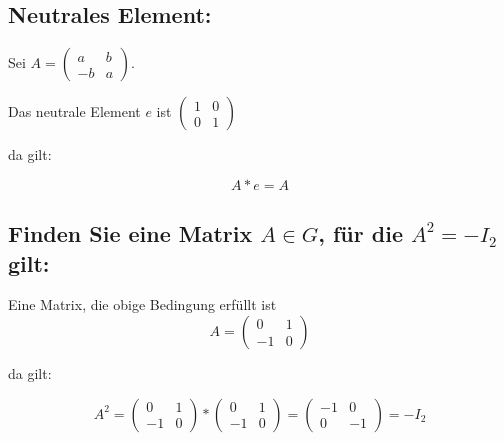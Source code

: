 \documentclass{article}
\begin{document}
\subsection*{Neutrales Element:}

Sei
\(
A=
\begin{pmatrix}
a & b \\
-b & a
\end{pmatrix}
\).

Das neutrale Element \(e\) ist
\(
\begin{pmatrix}
1 & 0 \\
0 & 1
\end{pmatrix}
\)

da gilt:

\[A * e = A\]

\subsection*{Finden Sie eine Matrix \(A \in G\), für die \(A^2=-I_{2}\) gilt:}

Eine Matrix, die obige Bedingung erfüllt ist
\[
A =
\begin{pmatrix}
0 & 1 \\
-1 & 0
\end{pmatrix}
\]

da gilt:

\[
A^2
=
\begin{pmatrix}
0 & 1 \\
-1 & 0
\end{pmatrix}
*
\begin{pmatrix}
0 & 1 \\
-1 & 0
\end{pmatrix}
=
\begin{pmatrix}
-1 & 0 \\
0 & -1
\end{pmatrix}
= -I_{2}
\]
\end{document}
